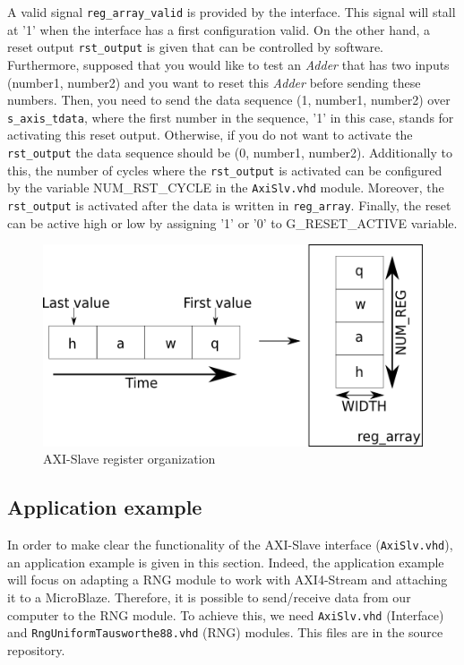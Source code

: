 A valid signal {\tt reg\_array\_valid} is provided by the interface. This signal will stall at '1' when the interface has a first configuration valid. On the other hand, a reset output {\tt rst\_output} is given that can be controlled by software. Furthermore, supposed that you would like to test an {\it Adder} that has two inputs (number1, number2) and you want to reset this {\it Adder} before sending these numbers. Then, you need to send the data sequence (1, number1, number2) over {\tt s\_axis\_tdata}, where the first number in the sequence, '1' in this case, stands for activating this reset output. Otherwise, if you do not want to activate the {\tt rst\_output} the data sequence should be (0, number1, number2). Additionally to this, the number of cycles where the {\tt rst\_output} is activated can be configured by the variable NUM\_RST\_CYCLE in the {\tt AxiSlv.vhd} module. Moreover, the {\tt rst\_output} is activated after the data is written in {\tt reg\_array}. Finally, the reset can be active high or low by assigning '1' or '0' to G\_RESET\_ACTIVE variable.

\begin{figure}[!h]
\includegraphics[scale=0.5]{images/axiSlvReg.png}
\caption{AXI-Slave register organization}
\label{f2}
\end{figure}
 
\subsection{Application example}
In order to make clear the functionality of the AXI-Slave interface ({\tt AxiSlv.vhd}), an application example is given in this section. Indeed, the application example will focus on adapting a RNG module to work with AXI4-Stream and attaching it to a MicroBlaze. Therefore, it is possible to send/receive data from our computer to the RNG module. To achieve this, we need {\tt AxiSlv.vhd} (Interface) and {\tt RngUniformTausworthe88.vhd} (RNG) modules. This files are in the source repository.

